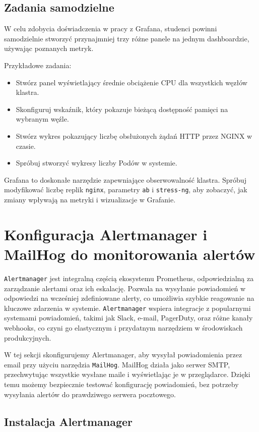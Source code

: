 \documentclass{article}
\begin{document}
\subsection{Zadania samodzielne}

W celu zdobycia doświadczenia w pracy z Grafana, studenci powinni samodzielnie stworzyć przynajmniej trzy różne panele na jednym dashboardzie, używając poznanych metryk. 

Przykładowe zadania:
\begin{itemize}
    \item Stwórz panel wyświetlający średnie obciążenie CPU dla wszystkich węzłów klastra.
    \item Skonfiguruj wskaźnik, który pokazuje bieżącą dostępność pamięci na wybranym węźle.
    \item Stwórz wykres pokazujący liczbę obsłużonych żądań HTTP przez NGINX w czasie.
    \item Spróbuj stworzyć wykresy liczby Podów w systemie.
\end{itemize}

Grafana to doskonałe narzędzie zapewniające obserwowalność klastra. Spróbuj modyfikować liczbę replik \texttt{nginx}, parametry \texttt{ab} i \texttt{stress-ng}, aby zobaczyć, jak zmiany wpływają na metryki i wizualizacje w Grafanie.

\section{Konfiguracja Alertmanager i MailHog do monitorowania alertów}

\texttt{Alertmanager} jest integralną częścią ekosystemu Prometheus, odpowiedzialną za zarządzanie alertami oraz ich eskalację. Pozwala na wysyłanie powiadomień w odpowiedzi na wcześniej zdefiniowane alerty, co umożliwia szybkie reagowanie na kluczowe zdarzenia w systemie. \texttt{Alertmanager} wspiera integracje z popularnymi systemami powiadomień, takimi jak Slack, e-mail, PagerDuty, oraz różne kanały webhooks, co czyni go elastycznym i przydatnym narzędziem w środowiskach produkcyjnych.

W tej sekcji skonfigurujemy Alertmanager, aby wysyłał powiadomienia przez email przy użyciu narzędzia \texttt{MailHog}. MailHog działa jako serwer SMTP, przechwytując wszystkie wysłane maile i wyświetlając je w przeglądarce. Dzięki temu możemy bezpiecznie testować konfigurację powiadomień, bez potrzeby wysyłania alertów do prawdziwego serwera pocztowego.

\subsection{Instalacja Alertmanager}
\end{document}
